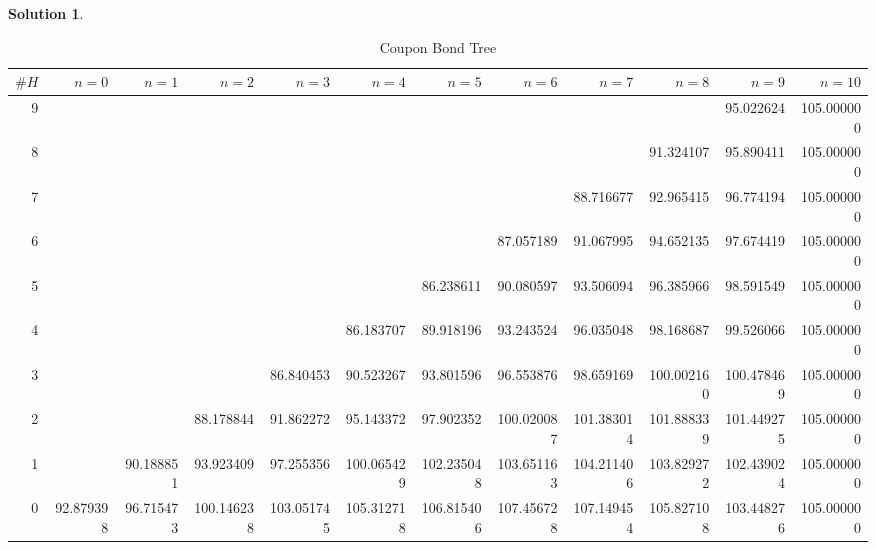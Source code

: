\documentclass[a4paper, 10pt]{article}
\theoremstyle{definition}
\theoremstyle{hSol}
\newtheorem*{solution}{Solution}
\begin{document}
\begin{solution}
\begin{landscape}
\begin{table}[H]
  \centering
  \small
  \caption{Coupon Bond Tree}
    \begin{tabular}{|r|rrrrrrrrrrr|}
    \hline
    $\#H$& $n=0$     & $n=1$     & $n=2$     & $n=3$     & $n=4$     & $n=5$     & $n=6$     & $n=7$     & $n=8$     & $n=9$     & $n=10$\\
    \hline
    9     &       &       &       &       &       &       &       &       &       & 95.022624 & 105.000000 \\
    8     &       &       &       &       &       &       &       &       & 91.324107 & 95.890411 & 105.000000 \\
    7     &       &       &       &       &       &       &       & 88.716677 & 92.965415 & 96.774194 & 105.000000 \\
    6     &       &       &       &       &       &       & 87.057189 & 91.067995 & 94.652135 & 97.674419 & 105.000000 \\
    5     &       &       &       &       &       & 86.238611 & 90.080597 & 93.506094 & 96.385966 & 98.591549 & 105.000000 \\
    4     &       &       &       &       & 86.183707 & 89.918196 & 93.243524 & 96.035048 & 98.168687 & 99.526066 & 105.000000 \\
    3     &       &       &       & 86.840453 & 90.523267 & 93.801596 & 96.553876 & 98.659169 & 100.002160 & 100.478469 & 105.000000 \\
    2     &       &       & 88.178844 & 91.862272 & 95.143372 & 97.902352 & 100.020087 & 101.383014 & 101.888339 & 101.449275 & 105.000000 \\
    1     &       & 90.188851 & 93.923409 & 97.255356 & 100.065429 & 102.235048 & 103.651163 & 104.211406 & 103.829272 & 102.439024 & 105.000000 \\
    0     & 92.879398 & 96.715473 & 100.146238 & 103.051745 & 105.312718 & 106.815406 & 107.456728 & 107.149454 & 105.827108 & 103.448276 & 105.000000 \\
    \hline
    \end{tabular}%
  \label{tab:cptree}%
\end{table}%
\end{landscape}


\end{solution}
\end{document}
